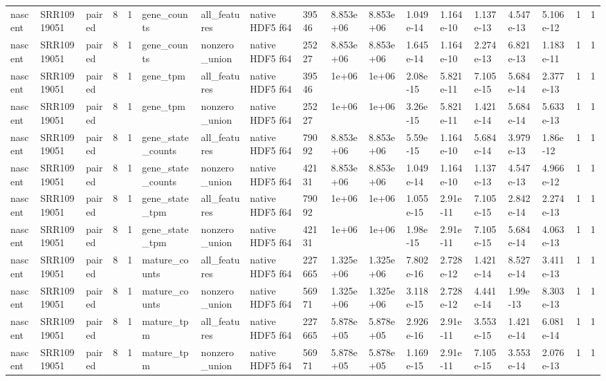 \begin{tabular}{llllllllllllllllll}
nascent & SRR10919051 & paired & 8 & 1 & gene\_counts & all\_features & native HDF5 f64 & 39546 & 8.853e+06 & 8.853e+06 & 1.049e-14 & 1.164e-10 & 1.137e-13 & 4.547e-13 & 5.106e-12 & 1 & 1 \\
nascent & SRR10919051 & paired & 8 & 1 & gene\_counts & nonzero\_union & native HDF5 f64 & 25227 & 8.853e+06 & 8.853e+06 & 1.645e-14 & 1.164e-10 & 2.274e-13 & 6.821e-13 & 1.183e-11 & 1 & 1 \\
nascent & SRR10919051 & paired & 8 & 1 & gene\_tpm & all\_features & native HDF5 f64 & 39546 & 1e+06 & 1e+06 & 2.08e-15 & 5.821e-11 & 7.105e-15 & 5.684e-14 & 2.377e-13 & 1 & 1 \\
nascent & SRR10919051 & paired & 8 & 1 & gene\_tpm & nonzero\_union & native HDF5 f64 & 25227 & 1e+06 & 1e+06 & 3.26e-15 & 5.821e-11 & 1.421e-14 & 5.684e-14 & 5.633e-13 & 1 & 1 \\
nascent & SRR10919051 & paired & 8 & 1 & gene\_state\_counts & all\_features & native HDF5 f64 & 79092 & 8.853e+06 & 8.853e+06 & 5.59e-15 & 1.164e-10 & 5.684e-14 & 3.979e-13 & 1.86e-12 & 1 & 1 \\
nascent & SRR10919051 & paired & 8 & 1 & gene\_state\_counts & nonzero\_union & native HDF5 f64 & 42131 & 8.853e+06 & 8.853e+06 & 1.049e-14 & 1.164e-10 & 1.137e-13 & 4.547e-13 & 4.966e-12 & 1 & 1 \\
nascent & SRR10919051 & paired & 8 & 1 & gene\_state\_tpm & all\_features & native HDF5 f64 & 79092 & 1e+06 & 1e+06 & 1.055e-15 & 2.91e-11 & 7.105e-15 & 2.842e-14 & 2.274e-13 & 1 & 1 \\
nascent & SRR10919051 & paired & 8 & 1 & gene\_state\_tpm & nonzero\_union & native HDF5 f64 & 42131 & 1e+06 & 1e+06 & 1.98e-15 & 2.91e-11 & 7.105e-15 & 5.684e-14 & 4.063e-13 & 1 & 1 \\
nascent & SRR10919051 & paired & 8 & 1 & mature\_counts & all\_features & native HDF5 f64 & 227665 & 1.325e+06 & 1.325e+06 & 7.802e-16 & 2.728e-12 & 1.421e-14 & 8.527e-14 & 3.411e-13 & 1 & 1 \\
nascent & SRR10919051 & paired & 8 & 1 & mature\_counts & nonzero\_union & native HDF5 f64 & 56971 & 1.325e+06 & 1.325e+06 & 3.118e-15 & 2.728e-12 & 4.441e-14 & 1.99e-13 & 8.303e-13 & 1 & 1 \\
nascent & SRR10919051 & paired & 8 & 1 & mature\_tpm & all\_features & native HDF5 f64 & 227665 & 5.878e+05 & 5.878e+05 & 2.926e-16 & 2.91e-11 & 3.553e-15 & 1.421e-14 & 6.081e-14 & 1 & 1 \\
nascent & SRR10919051 & paired & 8 & 1 & mature\_tpm & nonzero\_union & native HDF5 f64 & 56971 & 5.878e+05 & 5.878e+05 & 1.169e-15 & 2.91e-11 & 7.105e-15 & 3.553e-14 & 2.076e-13 & 1 & 1 \\

\end{tabular}
